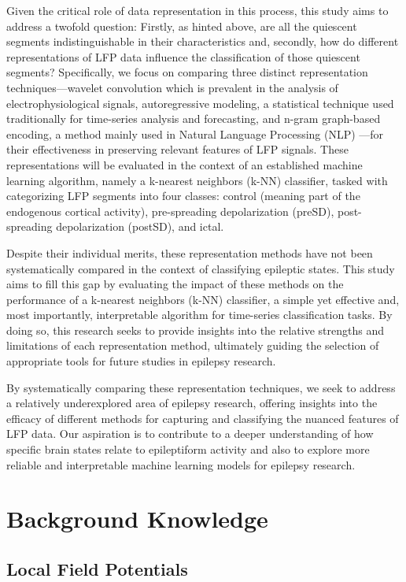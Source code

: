 \documentclass{article}
\begin{document}
Given the critical role of data representation in this process, this study aims to address a twofold question: Firstly, as hinted above, are all the quiescent segments indistinguishable in their characteristics and, secondly, how do different representations of LFP data influence the classification of those quiescent segments? Specifically, we focus on comparing three distinct representation techniques—wavelet convolution which is prevalent in the analysis of electrophysiological signals, autoregressive modeling, a statistical technique used traditionally for time-series analysis and forecasting, and n-gram graph-based encoding, a method mainly used in Natural Language Processing (NLP) —for their effectiveness in preserving relevant features of LFP signals. These representations will be evaluated in the context of an established machine learning algorithm, namely a k-nearest neighbors (k-NN) classifier, tasked with categorizing LFP segments into four classes: control (meaning part of the endogenous cortical activity), pre-spreading depolarization (preSD), post-spreading depolarization (postSD), and ictal.

Despite their individual merits, these representation methods have not been systematically compared in the context of classifying epileptic states. This study aims to fill this gap by evaluating the impact of these methods on the performance of a k-nearest neighbors (k-NN) classifier, a simple yet effective and, most importantly, interpretable algorithm for time-series classification tasks. By doing so, this research seeks to provide insights into the relative strengths and limitations of each representation method, ultimately guiding the selection of appropriate tools for future studies in epilepsy research.

By systematically comparing these representation techniques, we seek to address a relatively underexplored area of epilepsy research, offering insights into the efficacy of different methods for capturing and classifying the nuanced features of LFP data. Our aspiration is to contribute to a deeper understanding of how specific brain states relate to epileptiform activity and also to explore more reliable and interpretable machine learning models for epilepsy research.

\section{Background Knowledge}
\subsection{Local Field Potentials}
\end{document}
